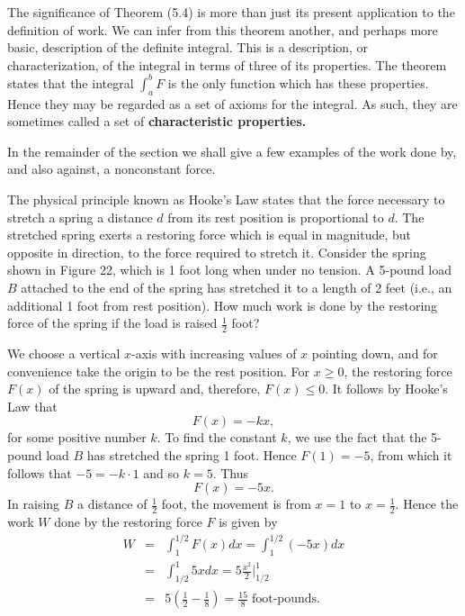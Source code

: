 The significance of Theorem (5.4) is more than just its present application to the definition of work. We can infer from this theorem another, and perhaps more basic, description of the definite integral. This is a description, or characterization, of the integral in terms of three of its properties. The theorem states that the integral $\int_a^b F$ is the only function which has these properties. Hence they may be regarded as a set of axioms for the integral. As such, they are sometimes called a set of \textbf{characteristic properties.}

In the remainder of the section we shall give a few examples of the work done by, and also against, a nonconstant force.
\medskip

\begin{example}
The physical principle known as Hooke's Law states that the force necessary to stretch a spring a distance $d$ from its rest position is proportional to $d$. The stretched spring exerts a restoring force which is equal in magnitude, but opposite in direction, to the force required to stretch it. Consider the spring shown in Figure 22, which is 1 foot long when under no tension. A 5-pound load $B$ attached to the end of the spring has stretched it to a length of 2 feet (i.e., an additional 1 foot from rest position). How much work is done by the restoring force of the spring if the load is raised $\frac{1}{2}$ foot?

\noindent We choose a vertical $x$-axis with increasing values of $x$ pointing down, and for convenience take the origin to be the rest position. For $x \geq 0$, the restoring force $F(x)$ of the spring is upward and, therefore, $F(x) \leq 0$. It follows by Hooke's Law that
$$
F(x) = - kx,
$$
\noindent for some positive number $k$. To find the constant $k$, we use the fact that the 5-pound load $B$ has stretched the spring 1 foot. Hence $F(1) = - 5$, from which it follows that $-5 = -k \cdot 1$ and so $k = 5$. Thus
$$
F(x) = - 5x.
$$
\noindent In raising $B$ a distance of $\frac{1}{2}$ foot, the movement is from $x = 1$ to $x = \frac{1}{2}$. Hence the work $W$ done by the restoring force $F$ is given by
\begin{eqnarray*}
W &=& \int_1^{1/2} F(x)dx = \int_1^{1/2} ( - 5x)dx \\
&=& \int_{1/2}^1 5xdx = 5\frac{x^2}{2} \big|_{1/2}^1 \\
&=& 5(\frac{1}{2} - \frac{1}{8}) = \frac{15}{8} \;\mbox{foot-pounds.}
\end{eqnarray*}
\end{example}

